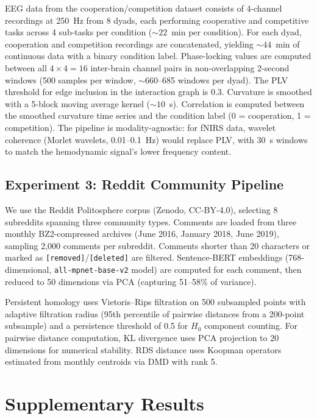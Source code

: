 \documentclass[11pt,a4paper]{article}
\theoremstyle{definition}
\begin{document}
EEG data from the cooperation/competition dataset \citep{czeszumski2022eeg} consists of 4-channel recordings at 250~Hz from 8 dyads, each performing cooperative and competitive tasks across 4 sub-tasks per condition (${\sim}22$~min per condition). For each dyad, cooperation and competition recordings are concatenated, yielding ${\sim}44$~min of continuous data with a binary condition label. Phase-locking values are computed between all $4 \times 4 = 16$ inter-brain channel pairs in non-overlapping 2-second windows (500 samples per window, ${\sim}660$--685 windows per dyad). The PLV threshold for edge inclusion in the interaction graph is 0.3. Curvature is smoothed with a 5-block moving average kernel (${\sim}10$~s). Correlation is computed between the smoothed curvature time series and the condition label (0 = cooperation, 1 = competition). The pipeline is modality-agnostic: for fNIRS data, wavelet coherence (Morlet wavelets, 0.01--0.1~Hz) would replace PLV, with 30~s windows to match the hemodynamic signal's lower frequency content.

\subsection{Experiment 3: Reddit Community Pipeline}

We use the Reddit Politosphere corpus \citep{hofmann2022politosphere} (Zenodo, CC-BY-4.0), selecting 8 subreddits spanning three community types. Comments are loaded from three monthly BZ2-compressed archives (June 2016, January 2018, June 2019), sampling 2{,}000 comments per subreddit. Comments shorter than 20 characters or marked as \texttt{[removed]}/\texttt{[deleted]} are filtered. Sentence-BERT embeddings (768-dimensional, \texttt{all-mpnet-base-v2} model) are computed for each comment, then reduced to 50 dimensions via PCA (capturing 51--58\% of variance).

Persistent homology uses Vietoris--Rips filtration on 500 subsampled points with adaptive filtration radius (95th percentile of pairwise distances from a 200-point subsample) and a persistence threshold of 0.5 for $H_0$ component counting. For pairwise distance computation, KL divergence uses PCA projection to 20 dimensions for numerical stability. RDS distance uses Koopman operators estimated from monthly centroids via DMD with rank 5.


\section{Supplementary Results}
\label{app:supplementary}
\end{document}
